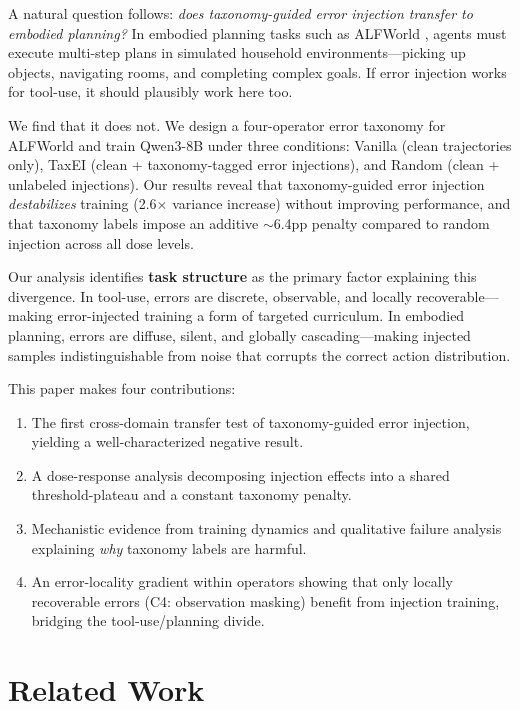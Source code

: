 \documentclass[11pt,a4paper]{article}
\begin{document}
A natural question follows: \emph{does taxonomy-guided error injection transfer to embodied planning?} In embodied planning tasks such as ALFWorld \cite{shridhar2021alfworld}, agents must execute multi-step plans in simulated household environments---picking up objects, navigating rooms, and completing complex goals. If error injection works for tool-use, it should plausibly work here too.

We find that it does not. We design a four-operator error taxonomy for ALFWorld and train Qwen3-8B under three conditions: Vanilla (clean trajectories only), TaxEI (clean + taxonomy-tagged error injections), and Random (clean + unlabeled injections). Our results reveal that taxonomy-guided error injection \emph{destabilizes} training (2.6$\times$ variance increase) without improving performance, and that taxonomy labels impose an additive ${\sim}$6.4pp penalty compared to random injection across all dose levels.

Our analysis identifies \textbf{task structure} as the primary factor explaining this divergence. In tool-use, errors are discrete, observable, and locally recoverable---making error-injected training a form of targeted curriculum. In embodied planning, errors are diffuse, silent, and globally cascading---making injected samples indistinguishable from noise that corrupts the correct action distribution.

This paper makes four contributions:
\begin{enumerate}
\item The first cross-domain transfer test of taxonomy-guided error injection, yielding a well-characterized negative result.
\item A dose-response analysis decomposing injection effects into a shared threshold-plateau and a constant taxonomy penalty.
\item Mechanistic evidence from training dynamics and qualitative failure analysis explaining \emph{why} taxonomy labels are harmful.
\item An error-locality gradient within operators showing that only locally recoverable errors (C4: observation masking) benefit from injection training, bridging the tool-use/planning divide.
\end{enumerate}

\section{Related Work}
\end{document}
